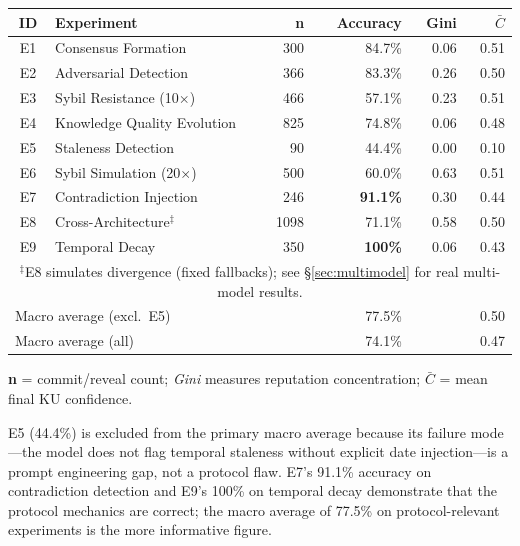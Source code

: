 \documentclass[10pt,twocolumn]{article}
\begin{document}
\begin{center}
\small
\setlength{\tabcolsep}{3pt}
\begin{tabular}{clrrrr}
\toprule
\textbf{ID} & \textbf{Experiment} & \textbf{n} & \textbf{Accuracy} & \textbf{Gini} & \textbf{$\bar{C}$} \\
\midrule
E1 & Consensus Formation           & 300 & 84.7\% & 0.06 & 0.51 \\
E2 & Adversarial Detection         & 366 & 83.3\% & 0.26 & 0.50 \\
E3 & Sybil Resistance (10$\times$) & 466 & 57.1\% & 0.23 & 0.51 \\
E4 & Knowledge Quality Evolution   & 825 & 74.8\% & 0.06 & 0.48 \\
E5 & Staleness Detection           &  90 & 44.4\% & 0.00 & 0.10 \\
E6 & Sybil Simulation (20$\times$) & 500 & 60.0\% & 0.63 & 0.51 \\
E7 & Contradiction Injection       & 246 & \textbf{91.1\%} & 0.30 & 0.44 \\
E8 & Cross-Architecture$^\ddagger$  &1098 & 71.1\% & 0.58 & 0.50 \\
E9 & Temporal Decay                & 350 & \textbf{100\%} & 0.06 & 0.43 \\
\midrule
\multicolumn{6}{p{7cm}}{$^\ddagger$E8 simulates divergence (fixed fallbacks); see §\ref{sec:multimodel} for real multi-model results.} \\
\midrule
\multicolumn{2}{l}{Macro average (excl.\ E5)} & & 77.5\% & & 0.50 \\
\multicolumn{2}{l}{Macro average (all)}        & & 74.1\% & & 0.47 \\
\bottomrule
\end{tabular}
\end{center}

\noindent \textbf{n} = commit/reveal count; \emph{Gini} measures reputation
concentration; $\bar{C}$ = mean final KU confidence.

E5 (44.4\%) is excluded from the primary macro average because its failure
mode—the model does not flag temporal staleness without explicit date
injection—is a prompt engineering gap, not a protocol flaw. E7's 91.1\%
accuracy on contradiction detection and E9's 100\% on temporal decay
demonstrate that the protocol mechanics are correct; the macro average of
77.5\% on protocol-relevant experiments is the more informative figure.
\end{document}
